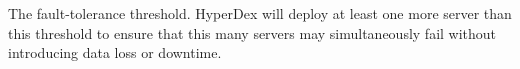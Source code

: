 The fault-tolerance threshold.  HyperDex will deploy at least one more server
than this threshold to ensure that this many servers may simultaneously fail
without introducing data loss or downtime.
